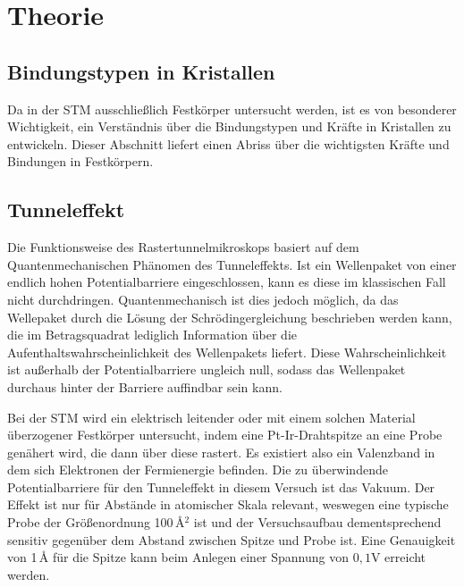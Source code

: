\section{Theorie}
\subsection{Bindungstypen in Kristallen}
Da in der STM ausschließlich Festkörper untersucht werden, ist es von besonderer Wichtigkeit, ein Verständnis über die Bindungstypen und Kräfte in Kristallen zu entwickeln. Dieser Abschnitt liefert einen Abriss über die wichtigsten Kräfte und Bindungen in Festkörpern.

\subsubsection{}
\subsubsection{}
\subsubsection{}
\subsubsection{}
\subsubsection{}

\subsection{Tunneleffekt}
Die Funktionsweise des Rastertunnelmikroskops basiert auf dem Quantenmechanischen Phänomen des Tunneleffekts. Ist ein Wellenpaket von einer endlich hohen Potentialbarriere eingeschlossen, kann es diese im klassischen Fall nicht durchdringen. Quantenmechanisch ist dies jedoch möglich, da das Wellepaket durch die Lösung der Schrödingergleichung beschrieben werden kann, die im Betragsquadrat lediglich Information über die Aufenthaltswahrscheinlichkeit des Wellenpakets liefert. Diese Wahrscheinlichkeit ist außerhalb der Potentialbarriere ungleich null, sodass das Wellenpaket durchaus hinter der Barriere auffindbar sein kann. 

\noindent Bei der STM wird ein elektrisch leitender oder mit einem solchen Material überzogener Festkörper untersucht, indem eine Pt-Ir-Drahtspitze an eine Probe genähert wird, die dann über diese rastert. Es existiert also ein Valenzband in dem sich Elektronen der Fermienergie befinden. Die zu überwindende Potentialbarriere für den Tunneleffekt in diesem Versuch ist das Vakuum. Der Effekt ist nur für Abstände in atomischer Skala relevant, weswegen eine typische Probe der Größenordnung 100\,\r{A}\(^2\) ist und der Versuchsaufbau dementsprechend sensitiv gegenüber dem Abstand zwischen Spitze und Probe ist. Eine Genauigkeit von 1\,\r{A} für die Spitze kann beim Anlegen einer Spannung von \(0,1\)V erreicht werden.


